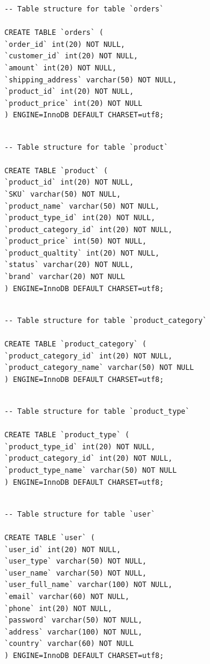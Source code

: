 \documentclass{article}
\begin{document}
		\begin{verbatim}
		-- Table structure for table `orders`
		
		CREATE TABLE `orders` (
		`order_id` int(20) NOT NULL,
		`customer_id` int(20) NOT NULL,
		`amount` int(20) NOT NULL,
		`shipping_address` varchar(50) NOT NULL,
		`product_id` int(20) NOT NULL,
		`product_price` int(20) NOT NULL
		) ENGINE=InnoDB DEFAULT CHARSET=utf8;
		
		\end{verbatim}
		
		\begin{verbatim}
		-- Table structure for table `product`

		CREATE TABLE `product` (
		`product_id` int(20) NOT NULL,
		`SKU` varchar(50) NOT NULL,
		`product_name` varchar(50) NOT NULL,
		`product_type_id` int(20) NOT NULL,
		`product_category_id` int(20) NOT NULL,
		`product_price` int(50) NOT NULL,
		`product_qualtity` int(20) NOT NULL,
		`status` varchar(20) NOT NULL,
		`brand` varchar(20) NOT NULL
		) ENGINE=InnoDB DEFAULT CHARSET=utf8;
		
		\end{verbatim}
		
		\begin{verbatim}
		-- Table structure for table `product_category`
		
		CREATE TABLE `product_category` (
		`product_category_id` int(20) NOT NULL,
		`product_category_name` varchar(50) NOT NULL
		) ENGINE=InnoDB DEFAULT CHARSET=utf8;
		
		\end{verbatim}
		
		\begin{verbatim}
		-- Table structure for table `product_type`
		
		CREATE TABLE `product_type` (
		`product_type_id` int(20) NOT NULL,
		`product_category_id` int(20) NOT NULL,
		`product_type_name` varchar(50) NOT NULL
		) ENGINE=InnoDB DEFAULT CHARSET=utf8;
		
		\end{verbatim}
		
		\begin{verbatim}
		-- Table structure for table `user`

		CREATE TABLE `user` (
		`user_id` int(20) NOT NULL,
		`user_type` varchar(50) NOT NULL,
		`user_name` varchar(50) NOT NULL,
		`user_full_name` varchar(100) NOT NULL,
		`email` varchar(60) NOT NULL,
		`phone` int(20) NOT NULL,
		`password` varchar(50) NOT NULL,
		`address` varchar(100) NOT NULL,
		`country` varchar(60) NOT NULL
		) ENGINE=InnoDB DEFAULT CHARSET=utf8;
		
		\end{verbatim}
		
\end{document}
